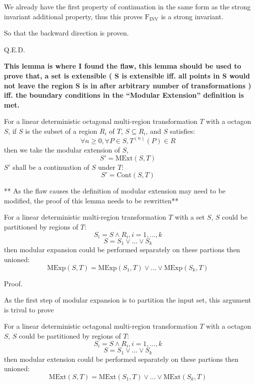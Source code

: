 \documentclass[letterpaper,]{article}
\providecommand{\tightlist}{%
  \setlength{\itemsep}{0pt}\setlength{\parskip}{0pt}}
\begin{document}
We already have the first property of continuation in the same form as
the strong invariant additional property, thus this proves
\(\mathrm{F_{INV}}\) is a strong invariant.

So that the backward direction is proven.

Q.E.D.

\begin{description}
\tightlist
\item[Lemma 8]
\textbf{This lemma is where I found the flaw, this lemma should be used
to prove that, a set is extensible ( S is extensible iff. all points in
S would not leave the region S is in after arbitrary number of
transformations ) iff. the boundary conditions in the ``Modular
Extension'' definition is met.}
\item[Lemma 9]
For a linear deterministic octagonal multi-region transformation \(T\)
with a octagon \(S\), if \(S\) is the subset of a region \(R_i\) of
\(T\), \(S \subseteq R_i\), and \(S\) satisfies:
\[\forall n \ge 0, \forall P \in S, T^{(n)}(P)\in R\] then we take the
modular extension of \(S\), \[S' = \mathrm{MExt}(S, T)\] \(S'\) shall be
a continuation of \(S\) under \(T\): \[S' = \mathrm{Cont}(S, T)\]
\end{description}

** As the flaw causes the definition of modular extension may need to be
modified, the proof of this lemma needs to be rewritten**

\begin{description}
\tightlist
\item[Lemma 10]
For a linear deterministic multi-region transformation \(T\) with a set
\(S\), \(S\) could be partitioned by regions of \(T\):
\[S_i = S \land R_i, i = 1, \dots, k\] \[S = S_1 \lor \dots \lor S_k\]
then modular expansion could be performed separately on these partions
then unioned:
\[\mathrm{MExp}(S,T) = \mathrm{MExp}(S_1, T) \lor \dots \lor \mathrm{MExp}(S_k, T) \]
\end{description}

Proof.

As the first step of modular expansion is to partition the input set,
this argument is trival to prove

\begin{description}
\tightlist
\item[Lemma 11]
For a linear deterministic octagonal multi-region transformation \(T\)
with a octagon \(S\), \(S\) could be partitioned by regions of \(T\):
\[S_i = S \land R_i, i = 1, \dots, k\] \[S = S_1 \lor \dots \lor S_k\]
then modular extension could be performed separately on these partions
then unioned:
\[\mathrm{MExt}(S,T) = \mathrm{MExt}(S_1, T) \lor \dots \lor \mathrm{MExt}(S_k, T) \]
\end{description}
\end{document}
